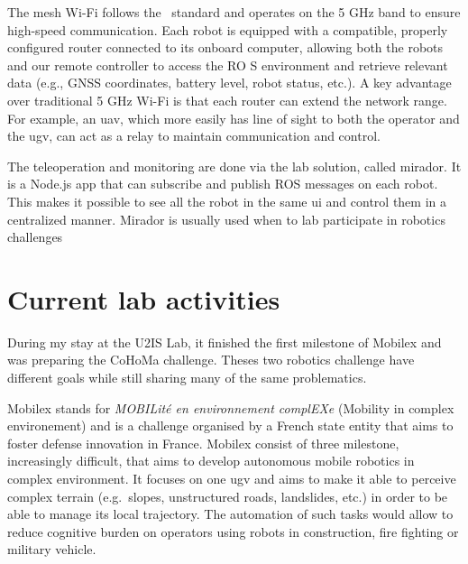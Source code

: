 The mesh Wi-Fi follows the~\cite{noauthor_ieee_2021} standard and operates on the 5 GHz band to ensure high-speed communication.
Each robot is equipped with a compatible, properly configured router connected to its onboard computer,
allowing both the robots and our remote controller to access the RO S environment and retrieve relevant
data (e.g., GNSS coordinates, battery level, robot status, etc.). A key advantage over traditional 5 GHz Wi-Fi is that each router can extend the network range.
For example, an \gls{uav}, which more easily has line of sight to both the operator and the \gls{ugv}, can act as a relay to maintain communication and control.

The teleoperation and monitoring are done via the lab solution, called mirador.
It is a Node.js app that can subscribe and publish ROS messages on each robot.
This makes it possible to see all the robot in the same \gls{ui} and control them in a centralized manner.
Mirador is usually used when to lab participate in robotics challenges


\section{Current lab activities}\label{sec:current-lab-activities}

During my stay at the U2IS Lab, it finished the first milestone of Mobilex and was preparing the CoHoMa challenge.
Theses two robotics challenge have different goals while still sharing many of the same problematics.

Mobilex stands for \textit{MOBILité en environnement complEXe} (Mobility in complex environement) and is a
challenge organised by a French state entity that aims to foster defense innovation in France.
Mobilex consist of three milestone, increasingly difficult, that aims to develop autonomous mobile robotics
in complex environment.
It focuses on one \gls{ugv} and aims to make it able to perceive complex terrain (e.g.\ slopes, unstructured roads, landslides, etc.) in
order to be able to manage its local trajectory.
The automation of such tasks would allow to reduce cognitive burden on operators using robots in construction,
fire fighting or military vehicle.

